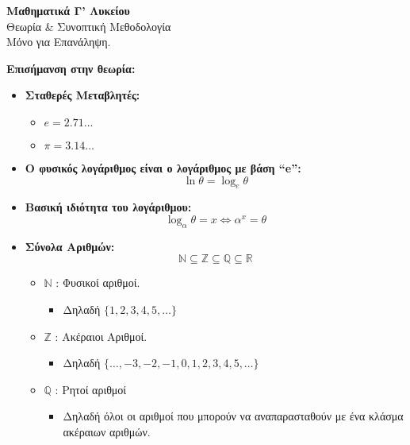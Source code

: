 \begin{center}
    \LARGE \textbf{Μαθηματικά Γ’ Λυκείου}\\[1ex]
    \large Θεωρία \& Συνοπτική Μεθοδολογία\\
    \normalsize Μόνο για Επανάληψη.
\end{center}

\vspace{1em}

\textbf{Επισήμανση στην θεωρία:}

\vspace{0.5em}
\begin{itemize}[leftmargin=1em]

    \item \textbf{Σταθερές Μεταβλητές:}
    \begin{itemize}
        \item $e = 2.71\ldots$
        \item $\pi = 3.14\ldots$
    \end{itemize}

    \item \textbf{Ο φυσικός λογάριθμος είναι ο λογάριθμος με βάση ``e'':}
    \[
    \ln \theta = \log_e \theta
    \]

    \item \textbf{Βασική ιδιότητα του λογάριθμου:}
    \[
    \log_\alpha \theta = x \iff \alpha^x = \theta
    \]

    \item \textbf{Σύνολα Αριθμών:}
    \[
    \mathbb{N} \subseteq \mathbb{Z} \subseteq \mathbb{Q} \subseteq \mathbb{R}
    \]

    \begin{itemize}
        \item $\mathbb{N}$ : Φυσικοί αριθμοί.
        \begin{itemize}
            \item Δηλαδή $\{1, 2, 3, 4, 5, \ldots\}$
        \end{itemize}

        \item $\mathbb{Z}$ : Ακέραιοι Αριθμοί.
        \begin{itemize}
            \item Δηλαδή $\{\ldots, -3, -2, -1, 0, 1, 2, 3, 4, 5, \ldots\}$
        \end{itemize}

        \item $\mathbb{Q}$ : Ρητοί αριθμοί
        \begin{itemize}
            \item Δηλαδή όλοι οι αριθμοί που μπορούν να αναπαρασταθούν με ένα κλάσμα ακέ\-ραιων αριθμών.
        \end{itemize}


\end{itemize}
\end{itemize}
